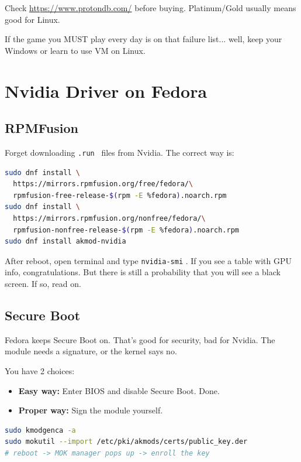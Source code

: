 \documentclass[lang=en,color=blue,12pt]{elegantbook}
\let\oldtexttt\texttt
\renewcommand{\texttt}[1]{%
  \begingroup
  \setlength{\fboxsep}{1pt}%
  \colorbox{gray!10}{\oldtexttt{#1}}%
  \endgroup
}
\begin{document}
\begin{note}
Check \url{https://www.protondb.com/} before buying. Platinum/Gold usually means
good for Linux.
\end{note}

If the game you MUST play every day is on that failure list... well,
keep your Windows or learn to use VM on Linux.

\section{\textbf{Nvidia Driver on Fedora}}

\subsection{\textbf{RPMFusion}}

Forget downloading \texttt{.run}\ files from Nvidia. The correct way is:

\begin{lstlisting}[language=bash]
sudo dnf install \
  https://mirrors.rpmfusion.org/free/fedora/\
  rpmfusion-free-release-$(rpm -E %fedora).noarch.rpm
sudo dnf install \
  https://mirrors.rpmfusion.org/nonfree/fedora/\
  rpmfusion-nonfree-release-$(rpm -E %fedora).noarch.rpm
sudo dnf install akmod-nvidia
\end{lstlisting}

After reboot, open terminal and type \texttt{nvidia-smi}.
If you see a table with GPU info, congratulations.
But there is still a probability that you will see a black screen. If so, read on.

\subsection{\textbf{Secure Boot}}

Fedora keeps Secure Boot on. That's good for security, bad for Nvidia.
The module needs a signature, or the kernel says no.

You have 2 choices:

\begin{itemize}[itemsep=0pt, parsep=0pt, topsep=0pt, partopsep=0pt]
\item \textbf{Easy way:} Enter BIOS and disable Secure Boot. Done.
\item \textbf{Proper way:} Sign the module yourself.
\end{itemize}

\begin{lstlisting}[language=bash]
sudo kmodgenca -a
sudo mokutil --import /etc/pki/akmods/certs/public_key.der
# reboot -> MOK manager pops up -> enroll the key
\end{lstlisting}
\end{document}
